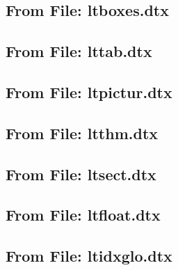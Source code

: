 \documentclass{l3in2edoc}
\begin{document}
\subsection{From File: ltboxes.dtx}

\leavevmode


\subsection{From File: lttab.dtx}

\leavevmode


\subsection{From File: ltpictur.dtx}

\leavevmode


\subsection{From File: ltthm.dtx}

\leavevmode


\subsection{From File: ltsect.dtx}

\leavevmode


\subsection{From File: ltfloat.dtx}


\begin{function}[]
  {
    \extrafloats
  }

\end{function}



\begin{variable}[]
  {
    \c@bottomnumber
  }
  
\end{variable}



\subsection{From File: ltidxglo.dtx}
\end{document}
